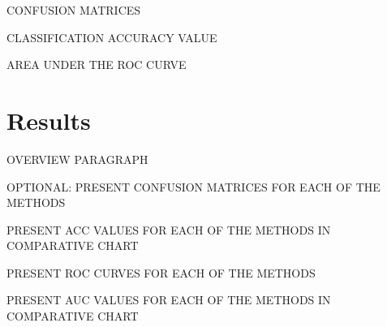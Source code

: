 \documentclass[12pt]{article}
\begin{document}
CONFUSION MATRICES

CLASSIFICATION ACCURACY VALUE

AREA UNDER THE ROC CURVE




\section{Results}
\label{sec:resu}

OVERVIEW PARAGRAPH

OPTIONAL: PRESENT CONFUSION MATRICES FOR EACH OF THE METHODS

PRESENT ACC VALUES FOR EACH OF THE METHODS IN COMPARATIVE CHART

PRESENT ROC CURVES FOR EACH OF THE METHODS

PRESENT AUC VALUES FOR EACH OF THE METHODS IN COMPARATIVE CHART


\end{document}
